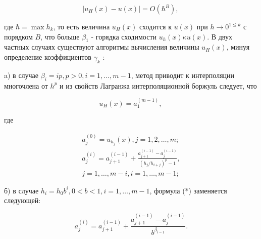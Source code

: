 \documentclass[10pt]{article}
\begin{document}
\[

\left|u_{H}(x)-u(x)\right|=O\left(\hbar^{B}\right) \text {, }

\]



где $\hbar=\max h_{k}$, то есть величина $u_{H}(x)$ сходится к $u(x)$ при $h \rightarrow 0^{1 \leqslant k}$ с порядком $B$, что больше $\beta_{1}$ - горядка сходимости $u_{h}(x) \kappa u(x)$. В двух частных случаях существуют алгоритмы вычисления величины $u_{H}(x)$, минуя определение коэффициентов $\gamma_{k}$ :



a) в случае $\beta_{i}=i p, p>0, i=1, \ldots, m-1$, метод приводит к интерполяции многочлена от $h^{p}$ и из свойств Лагранжа интерполяционной боржуль следует, что



\[

u_{H}(x)=a_{1}^{(m-1)} \text {, }

\]



где



\[

\begin{gathered}

a_{j}^{(0)}=u_{h_{j}}(x), j=1,2, \ldots, m ; \\

a_{j}^{(i)}=a_{j+1}^{(i-1)}+\frac{a_{j+1}^{(i-1)}-a_{j}^{(i-1)}}{\left(h_{j} / h_{i+j}\right)^{p}-1}, \\

j=1, \ldots, m-i, i=1, \ldots, m-1 ;

\end{gathered}

\]



б) в случае $h_{i}=h_{0} b^{i}, 0<b<1, i=1, \ldots, m-1$, формула (*) заменяется следующей:



\[

a_{j}^{(i)}=a_{j+1}^{(i-1)}+\frac{a_{j+1}^{(i-1)}-a_{j}^{(i-1)}}{b^{\beta_{i-1}}} .

\]
\end{document}
